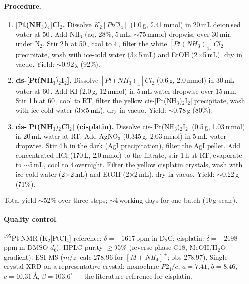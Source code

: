 \paragraph{Procedure.}
\begin{enumerate}
  \item \textbf{[Pt(NH$_3$)$_4$]Cl$_2$.}  Dissolve
        $K_2[PtCl_4]$ (1.0\,g, 2.41\,mmol) in 20\,mL
        deionised water at 50\,\textcelsius.  Add
        NH$_3$ (aq, 28\%, 5\,mL, $\sim$75\,mmol) dropwise
        over 30\,min under N$_2$.  Stir 2\,h at 50\,\textcelsius,
        cool to 4\,\textcelsius, filter the white
        $[Pt(NH_3)_4]Cl_2$ precipitate, wash with ice-cold
        water (3$\times$5\,mL) and EtOH (2$\times$5\,mL),
        dry in vacuo.  Yield: $\sim$0.92\,g
        (92\%).
  \item \textbf{cis-[Pt(NH$_3$)$_2$I$_2$].}  Dissolve
        $[Pt(NH_3)_4]Cl_2$ (0.6\,g, 2.0\,mmol) in
        30\,mL water at 60\,\textcelsius.  Add KI (2.0\,g,
        12\,mmol) in 5\,mL water dropwise over 15\,min.
        Stir 1\,h at 60\,\textcelsius, cool to RT, filter
        the yellow cis-[Pt(NH$_3$)$_2$I$_2$] precipitate,
        wash with ice-cold water (3$\times$5\,mL), dry in
        vacuo.  Yield: $\sim$0.78\,g (80\%).
  \item \textbf{cis-[Pt(NH$_3$)$_2$Cl$_2$] (cisplatin).}
        Dissolve cis-[Pt(NH$_3$)$_2$I$_2$] (0.5\,g,
        1.03\,mmol) in 20\,mL water at RT.  Add
        AgNO$_3$ (0.345\,g, 2.03\,mmol) in 5\,mL water
        dropwise.  Stir 4\,h in the dark (AgI
        precipitation), filter the AgI pellet.
        Add concentrated HCl (170\,\textmu L, 2.0\,mmol)
        to the filtrate, stir 1\,h at RT, evaporate to
        $\sim$5\,mL, cool to 4\,\textcelsius overnight.
        Filter the yellow cisplatin crystals, wash with
        ice-cold water (2$\times$2\,mL) and EtOH
        (2$\times$2\,mL), dry in vacuo.  Yield:
        $\sim$0.22\,g (71\%).
\end{enumerate}
Total yield $\sim$52\% over three steps;
$\sim$4\,working days for one batch (10\,g scale).

\paragraph{Quality control.}
$^{195}$Pt-NMR (K$_2$[PtCl$_4$] reference: $\delta =
-1617$\,ppm in D$_2$O; cisplatin: $\delta = -2098$\,ppm in
DMSO-$d_6$).  HPLC purity $\geq$95\% (reverse-phase C18,
MeOH/H$_2$O gradient).  ESI-MS ($m/z$: calc 278.96 for
$[M+NH_4]^+$; obs 278.97).  Single-crystal XRD on a
representative crystal: monoclinic $P2_1/c$, $a = 7.41$,
$b = 8.46$, $c = 10.31$\,\AA, $\beta = 103.6^\circ$ --- the
literature reference for cisplatin.

